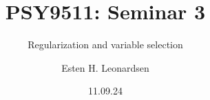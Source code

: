 \documentclass[8pt]{beamer}
\title{PSY9511: Seminar 3}
\subtitle{Regularization and variable selection}
\author{Esten H. Leonardsen}
\date{11.09.24}
\begin{document}
	\begin{frame}
	 	\maketitle
	\end{frame}




\end{document}
